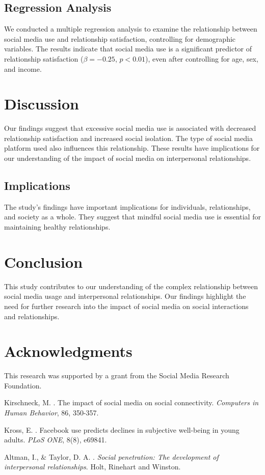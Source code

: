 \documentclass[12pt,a4paper]{article}
\begin{document}
\subsection{Regression Analysis}
We conducted a multiple regression analysis to examine the relationship between social media use and relationship satisfaction, controlling for demographic variables. The results indicate that social media use is a significant predictor of relationship satisfaction ($\beta = -0.25$, $p < 0.01$), even after controlling for age, sex, and income.

\section{Discussion}
Our findings suggest that excessive social media use is associated with decreased relationship satisfaction and increased social isolation. The type of social media platform used also influences this relationship. These results have implications for our understanding of the impact of social media on interpersonal relationships.

\subsection{Implications}
The study's findings have important implications for individuals, relationships, and society as a whole. They suggest that mindful social media use is essential for maintaining healthy relationships.

\section{Conclusion}
This study contributes to our understanding of the complex relationship between social media usage and interpersonal relationships. Our findings highlight the need for further research into the impact of social media on social interactions and relationships.

\section*{Acknowledgments}
This research was supported by a grant from the Social Media Research Foundation.


\begin{thebibliography}{99}

Kirschneck, M. . The impact of social media on social connectivity. \emph{Computers in Human Behavior}, 86, 350-357.

Kross, E. . Facebook use predicts declines in subjective well-being in young adults. \emph{PLoS ONE}, 8(8), e69841.

Altman, I., \& Taylor, D. A. . \emph{Social penetration: The development of interpersonal relationships}. Holt, Rinehart and Winston.

\end{thebibliography}
\end{document}
